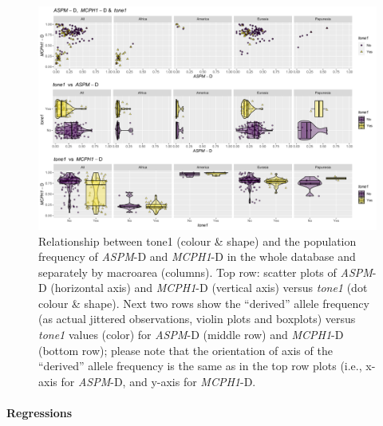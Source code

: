 \documentclass[twoside,onecolumn]{article}
\begin{document}
\begin{figure}[h]
  \centering
  \includegraphics[width=\textwidth]{../../code/figures/tone1_genes}
  \caption{Relationship between tone1 (colour \& shape) and the population frequency of \textit{ASPM}-D and \textit{MCPH1}-D in the whole database and separately by macroarea (columns). Top row: scatter plots of \textit{ASPM}-D (horizontal axis) and \textit{MCPH1}-D (vertical axis) versus \textit{tone1} (dot colour \& shape). Next two rows show the ``derived'' allele frequency (as actual jittered observations, violin plots and boxplots) versus \textit{tone1} values (color) for \textit{ASPM}-D (middle row) and \textit{MCPH1}-D (bottom row); please note that the orientation of axis of the ``derived'' allele frequency is the same as in the top row plots (i.e., x-axis for \textit{ASPM}-D, and y-axis for \textit{MCPH1}-D.}
  \label{Fig:tone1_genes}
\end{figure}


\paragraph{Regressions}
\end{document}
